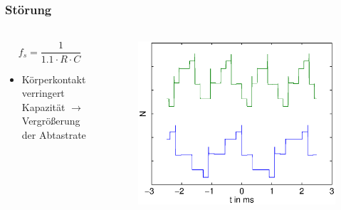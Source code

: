 \begin{frame}
    \frametitle{Störung}
    \framesubtitle{}
    \begin{columns}[c]
            \begin{block}{}
                \begin{equation*}
                    f_s = \frac{1}{1.1 \cdot R \cdot C}
                \end{equation*}
            \begin{itemize}
                \item Körperkontakt verringert Kapazität $\rightarrow$
                Vergrößerung der Abtastrate
            \end{itemize}
            \end{block}
        \begin{figure}[H]
        \begin{center}
                \includegraphics[scale=0.4]{./img/graph/Aufgabe3_Druck_N.eps}
        \end{center}
        \end{figure}
    \end{columns}
    
\end{frame}
